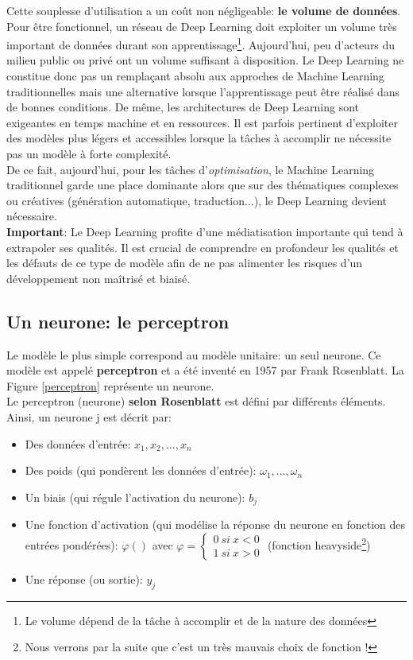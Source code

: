 \noindent Cette souplesse d'utilisation a un coût non négligeable: \textbf{le volume de données}. Pour être fonctionnel, un réseau de Deep Learning doit exploiter un volume très important de données durant son apprentissage\footnote{Le volume dépend de la tâche à accomplir et de la nature des données}. Aujourd'hui, peu d'acteurs du milieu public ou privé ont un volume suffisant à disposition. Le Deep Learning ne constitue donc pas un remplaçant absolu aux approches de Machine Learning traditionnelles mais une alternative lorsque l'apprentissage peut être réalisé dans de bonnes conditions. De même, les architectures de Deep Learning sont exigeantes en temps machine et en ressources. Il est parfois pertinent d'exploiter des modèles plus légers et accessibles lorsque la tâches à accomplir ne nécessite pas un modèle à forte complexité.\\

\noindent De ce fait, aujourd'hui, pour les tâches d'\textit{optimisation}, le Machine Learning traditionnel garde une place dominante alors que sur des thématiques complexes ou créatives (génération automatique, traduction...), le Deep Learning devient nécessaire.\\

\noindent \textbf{Important}: Le Deep Learning profite d'une médiatisation importante qui tend à extrapoler ses qualités. Il est crucial de comprendre en profondeur les qualités et les défauts de ce type de modèle afin de ne pas alimenter les risques d'un développement non maîtrisé et biaisé.

\subsection{Un neurone: le perceptron}
Le modèle le plus simple correspond au modèle unitaire: un seul neurone. Ce modèle est appelé \textbf{perceptron} et a été inventé en 1957 par Frank Rosenblatt. La Figure \ref{perceptron} représente un neurone.\\

\noindent Le perceptron (neurone) \textbf{selon Rosenblatt} est défini par différents éléments. Ainsi, un neurone j est décrit par:\\
\begin{itemize}
    \item Des données d'entrée: $x_1,x_2,...,x_n$
    \item Des poids (qui pondèrent les données d'entrée): $\omega_1,...,\omega_n$
    \item Un biais (qui régule l'activation du neurone): $b_j$
    \item Une fonction d'activation (qui modélise la réponse du neurone en fonction des entrées pondérées): $\varphi()$ avec $\varphi= \left\{\begin{array}{ll}0 \ si \ x<0 \\1 \ si \ x> 0\end{array}\right.$ (fonction heavyside\footnote{Nous verrons par la suite que c'est un très mauvais choix de fonction !})
    \item Une réponse (ou sortie): $y_j$
\end{itemize}

